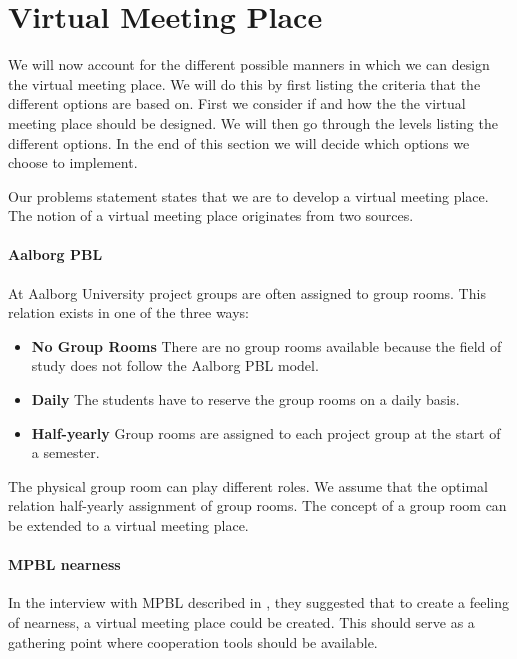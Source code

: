 \section{Virtual Meeting Place}
\label{sec:virtualMeetingPlace}

We will now account for the different possible manners in which we can design the virtual meeting place. 
We will do this by first listing the criteria that the different options are based on. 
First we consider if and how the the virtual meeting place should be designed.
We will then go through the levels listing the different options. 
In the end of this section we will decide which options we choose to implement.

Our problems statement states that we are to develop a virtual meeting place. 
The notion of a virtual meeting place originates from two sources.

\paragraph{Aalborg PBL} 
At Aalborg University project groups are often assigned to group rooms. This relation exists in one of the three ways:
\begin{itemize}
	\item \textbf{No Group Rooms} There are no group rooms available because the field of study does not follow the Aalborg PBL model.
	\item \textbf{Daily} The students have to reserve the group rooms on a daily basis.
	\item \textbf{Half-yearly} Group rooms are assigned to each project group at the start of a semester.
\end{itemize} 
The physical group room can play different roles. 
We assume that the optimal relation half-yearly assignment of group rooms.
The concept of a group room can be extended to a virtual meeting place.  

\paragraph{MPBL nearness}
In the interview with MPBL described in , they suggested that to create a feeling of nearness, a virtual meeting place could be created. 
This should serve as a gathering point where cooperation tools should be available. \\

